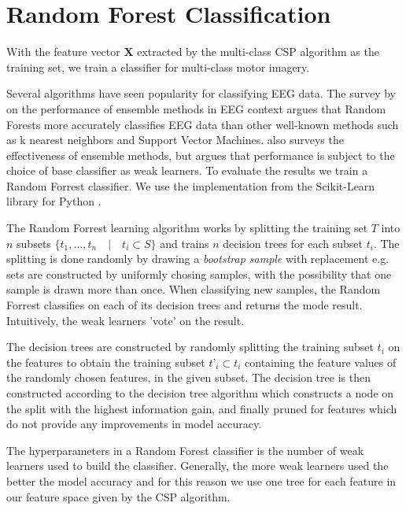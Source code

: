 \section{Random Forest Classification}

With the feature vector $\mathbf{X}$ extracted by the multi-class CSP algorithm as the training set, we train a classifier for multi-class motor imagery.

Several algorithms have seen popularity for classifying EEG data. The survey by \citet{chan2015systematic} on the performance of ensemble methods in EEG context argues that Random Forests more accurately classifies EEG data than other well-known methods such as k nearest neighbors and Support Vector Machines. \citet{sun2007experimental} also surveys the effectiveness of ensemble methods, but argues that performance is subject to the choice of base classifier as weak learners. To evaluate the results we train a Random Forrest classifier. We use the implementation from the Scikit-Learn library for Python \citep{scikit-learn}.   

The Random Forrest learning algorithm works by splitting the training set $T$ into $n$ subsets $\{t_1,…,t_n \quad | \quad t_i \subset S\}$ and trains $n$ decision trees for each subset $t_i$. The splitting is done randomly by drawing a \emph{bootstrap sample} with replacement e.g. sets are constructed by uniformly chosing samples, with the possibility that one sample is drawn more than once. When classifying new samples, the Random Forrest classifies on each of its decision trees and returns the mode result. Intuitively, the weak learners 'vote' on the result.

The decision trees are constructed by randomly splitting the training subset $t_i$ on the features to obtain the training subset $t’_i \subset t_i$ containing the feature values of the randomly chosen features, in the given subset. The decision tree is then constructed according to the decision tree algorithm which constructs a node on the split with the highest information gain, and finally pruned for features which do not provide any improvements in model accuracy.

The hyperparameters in a Random Forest classifier is the number of weak learners used to build the classifier. Generally, the more weak learners used the better the model accuracy and for this reason we use one tree for each feature in our feature space given by the CSP algorithm. 